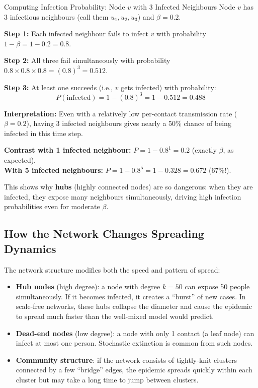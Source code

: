 \begin{examplebox}{Computing Infection Probability: Node $v$ with 3 Infected Neighbours}
Node $v$ has 3 infectious neighbours (call them $u_1, u_2, u_3$) and $\beta = 0.2$.

\medskip
\textbf{Step 1:} Each infected neighbour fails to infect $v$ with probability $1 - \beta = 1 - 0.2 = 0.8$.

\medskip
\textbf{Step 2:} All three fail simultaneously with probability $0.8 \times 0.8 \times 0.8 = (0.8)^3 = 0.512$.

\medskip
\textbf{Step 3:} At least one succeeds (i.e., $v$ gets infected) with probability:
\[
P(\text{infected}) = 1 - (0.8)^3 = 1 - 0.512 = \mathbf{0.488}
\]

\textbf{Interpretation:} Even with a relatively low per-contact transmission rate ($\beta = 0.2$), having 3 infected neighbours gives nearly a 50\% chance of being infected in this time step.

\medskip
\textbf{Contrast with 1 infected neighbour:} $P = 1 - 0.8^1 = 0.2$ (exactly $\beta$, as expected).\\
\textbf{With 5 infected neighbours:} $P = 1 - 0.8^5 = 1 - 0.328 = 0.672$ (67\%!).

This shows why \textbf{hubs} (highly connected nodes) are so dangerous: when they are infected, they expose many neighbours simultaneously, driving high infection probabilities even for moderate $\beta$.
\end{examplebox}

\subsection{How the Network Changes Spreading Dynamics}

The network structure modifies both the speed and pattern of spread:

\begin{itemize}
    \item \textbf{Hub nodes} (high degree): a node with degree $k = 50$ can expose 50 people simultaneously. If it becomes infected, it creates a ``burst'' of new cases. In scale-free networks, these hubs collapse the diameter and cause the epidemic to spread much faster than the well-mixed model would predict.
    \item \textbf{Dead-end nodes} (low degree): a node with only 1 contact (a leaf node) can infect at most one person. Stochastic extinction is common from such nodes.
    \item \textbf{Community structure}: if the network consists of tightly-knit clusters connected by a few ``bridge'' edges, the epidemic spreads quickly within each cluster but may take a long time to jump between clusters.
\end{itemize}

